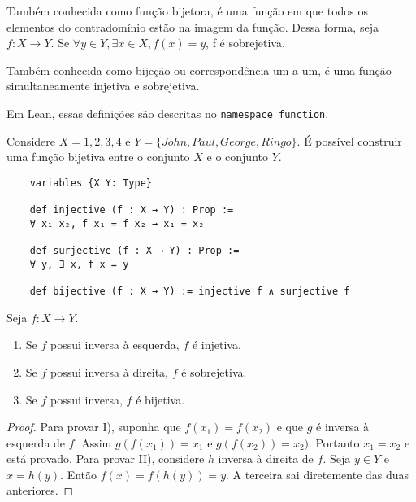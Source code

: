 \begin{definition}
    \label{def6}
    Também conhecida como função bijetora, é uma função em que todos os elementos do contradomínio 
    estão na imagem da função. Dessa forma, seja $f: X \to Y$. Se $\forall y \in Y, \exists x \in X, f(x) = y$, 
    f é sobrejetiva. 
   \end{definition}

\begin{definition}
    \label{def7}
    Também conhecida como bijeção ou correspondência um a um, é uma função simultaneamente injetiva e 
    sobrejetiva. 
\end{definition}

Em Lean, essas definições são descritas no \lstinline{namespace function}. 

\begin{example}
    Considere $X = {1,2,3,4}$ e $Y = \{John, Paul, George, Ringo\}$. É possível construir uma função bijetiva 
    entre o conjunto $X$ e o conjunto $Y$.  
\end{example}

\begin{lstlisting}
    variables {X Y: Type}

    def injective (f : X → Y) : Prop :=
    ∀ x₁ x₂, f x₁ = f x₂ → x₁ = x₂

    def surjective (f : X → Y) : Prop :=
    ∀ y, ∃ x, f x = y

    def bijective (f : X → Y) := injective f ∧ surjective f
\end{lstlisting}

\begin{theorem}
    \label{prop5}
    Seja $f : X \to Y$.
    \renewcommand{\labelenumi}{\Roman{enumi}}
    \begin{enumerate}
        \item Se $f$ possui inversa à esquerda, $f$ é injetiva.
        \item Se $f$ possui inversa à direita, $f$ é sobrejetiva. 
        \item Se $f$ possui inversa, $f$ é bijetiva. 
    \end{enumerate}
\end{theorem}
\begin{proof}
    Para provar I), suponha que $f(x_1) = f(x_2)$ e que $g$ é inversa à esquerda
    de $f$. Assim $g(f(x_1)) = x_1$ e $g(f(x_2)) = x_2)$. Portanto $x_1 = x_2$ e 
    está provado. Para provar II), considere $h$ inversa à direita de $f$. Seja 
    $y \in Y$ e $x = h(y)$. Então $f(x) = f(h(y)) = y$. A terceira sai diretemente 
    das duas anteriores.  
\end{proof}

